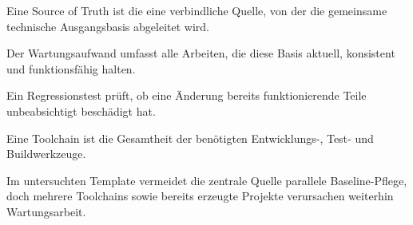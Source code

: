 \begin{beginnerstatement}

Eine Source of Truth ist die eine verbindliche Quelle, von der die gemeinsame
technische Ausgangsbasis abgeleitet wird.

Der Wartungsaufwand umfasst alle Arbeiten, die diese Basis aktuell,
konsistent und funktionsfähig halten.

Ein Regressionstest prüft, ob eine Änderung bereits funktionierende Teile
unbeabsichtigt beschädigt hat.

Eine Toolchain ist die Gesamtheit der benötigten Entwicklungs-, Test- und
Buildwerkzeuge.

Im untersuchten Template vermeidet die zentrale Quelle parallele
Baseline-Pflege, doch mehrere Toolchains sowie bereits erzeugte Projekte
verursachen weiterhin Wartungsarbeit.

\end{beginnerstatement}
